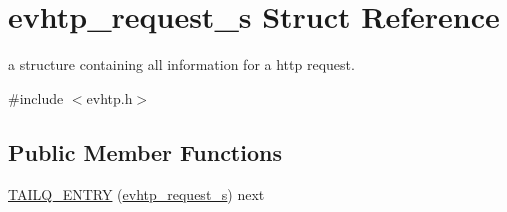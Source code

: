 \hypertarget{structevhtp__request__s}{\section{evhtp\-\_\-request\-\_\-s Struct Reference}
\label{structevhtp__request__s}
}


a structure containing all information for a http request.  




{\ttfamily \#include $<$evhtp.\-h$>$}

\subsection*{Public Member Functions}
\begin{DoxyCompactItemize}
\item 
\hyperlink{structevhtp__request__s_aafae5652c2c5f39a21185a64eaf7c3b6}{T\-A\-I\-L\-Q\-\_\-\-E\-N\-T\-R\-Y} (\hyperlink{structevhtp__request__s}{evhtp\-\_\-request\-\_\-s}) next
\end{DoxyCompactItemize}
